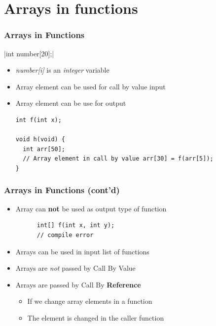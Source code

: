 \documentclass{../c-lecture}
\begin{document}
\section{Arrays in functions}

\begin{frame}[fragile]
  \frametitle{Arrays in Functions}
  |int number[20];|
  \begin{itemize}
    \item
      \textit{\color{LimeGreen} number[i]} is an
      \textit{\color{Orange} integer} variable

    \item Array element can be used for call by value input
    \item Array element can be use for output
    \begin{verbatim}
int f(int x);

void h(void) {
  int arr[50];
  // Array element in call by value arr[30] = f(arr[5]);
}
    \end{verbatim}
  \end{itemize}
\end{frame}

\begin{frame}[fragile]
  \frametitle{Arrays in Functions (cont’d)}
  \begin{itemize}
    \item
      Array can \textbf{\color{RubineRed} not} be used as output type of
      function
    \begin{verbatim}
      int[] f(int x, int y);
      // compile error
    \end{verbatim}
    \item Arrays can be used in input list of functions
    \item
      Arrays are \textit{\color{RubineRed} not} passed by Call By Value
    \item
      Arrays are passed by Call By \textbf{\color{LimeGreen} Reference}
    \begin{itemize}
      \item If we change array elements in a function
      \item The element is changed in the caller function
    \end{itemize}
  \end{itemize}
\end{frame}
\end{document}
